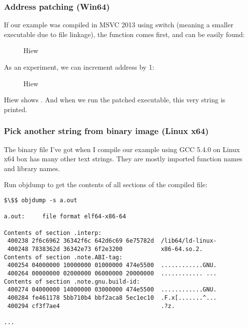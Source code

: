 \subsubsection{Address patching (Win64)}

If our example was compiled in MSVC 2013 using  switch
(meaning a smaller executable due to  file linkage), the \main function comes first, and can be easily found:

\begin{figure}[H]
\centering
{}
\caption{Hiew}
\label{}
\end{figure}

As an experiment, we can \gls{increment} address by 1:

\begin{figure}[H]
\centering
{}
\caption{Hiew}
\label{}
\end{figure}

Hiew shows .
And when we run the patched executable, this very string is printed.

\subsubsection{Pick another string from binary image (Linux x64)}

The binary file I've got when I compile our example using GCC 5.4.0 on Linux x64 box has many other text strings.
They are mostly imported function names and library names.

Run objdump to get the contents of all sections of the compiled file:

\begin{lstlisting}[basicstyle=\ttfamily, mathescape]
$\$$ objdump -s a.out

a.out:     file format elf64-x86-64

Contents of section .interp:
 400238 2f6c6962 36342f6c 642d6c69 6e75782d  /lib64/ld-linux-
 400248 7838362d 36342e73 6f2e3200           x86-64.so.2.
Contents of section .note.ABI-tag:
 400254 04000000 10000000 01000000 474e5500  ............GNU.
 400264 00000000 02000000 06000000 20000000  ............ ...
Contents of section .note.gnu.build-id:
 400274 04000000 14000000 03000000 474e5500  ............GNU.
 400284 fe461178 5bb710b4 bbf2aca8 5ec1ec10  .F.x[.......^...
 400294 cf3f7ae4                             .?z.

...
\end{lstlisting}

